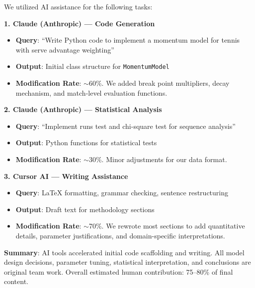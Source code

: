 \documentclass{mcmthesis}
\begin{document}
We utilized AI assistance for the following tasks:

\textbf{1. Claude (Anthropic) --- Code Generation}
\begin{itemize}
    \item \textbf{Query}: ``Write Python code to implement a momentum model for tennis with serve advantage weighting''
    \item \textbf{Output}: Initial class structure for \texttt{MomentumModel}
    \item \textbf{Modification Rate}: $\sim$60\%. We added break point multipliers, decay mechanism, and match-level evaluation functions.
\end{itemize}

\textbf{2. Claude (Anthropic) --- Statistical Analysis}
\begin{itemize}
    \item \textbf{Query}: ``Implement runs test and chi-square test for sequence analysis''
    \item \textbf{Output}: Python functions for statistical tests
    \item \textbf{Modification Rate}: $\sim$30\%. Minor adjustments for our data format.
\end{itemize}

\textbf{3. Cursor AI --- Writing Assistance}
\begin{itemize}
    \item \textbf{Query}: LaTeX formatting, grammar checking, sentence restructuring
    \item \textbf{Output}: Draft text for methodology sections
    \item \textbf{Modification Rate}: $\sim$70\%. We rewrote most sections to add quantitative details, parameter justifications, and domain-specific interpretations.
\end{itemize}

\textbf{Summary}: AI tools accelerated initial code scaffolding and writing. All model design decisions, parameter tuning, statistical interpretation, and conclusions are original team work. Overall estimated human contribution: 75--80\% of final content.
\end{document}
